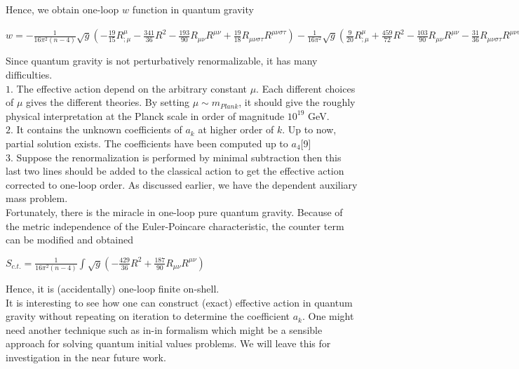 \documentclass[a4paper,12 pt]{article}
\begin{document}
Hence, we obtain one-loop $w$ function in quantum gravity
\begin{center}
$ w = - \frac{1}{16\pi^{2}(n-4)}\sqrt{g}(-
\frac{19}{15}R_{;\mu}^{\mu}- \frac{341}{36}R^{2}-
\frac{193}{90}R_{\mu\nu}R^{\mu\nu} +
\frac{19}{18}R_{\mu\nu\sigma\tau}R^{\mu\nu\sigma\tau}) -
\frac{1}{16\pi^{2}}\sqrt{g}(\frac{9}{20}R_{;\mu}^{\mu} +
\frac{459}{72}R^{2}-
\frac{103}{90}R_{\mu\nu}R^{\mu\nu}-\frac{31}{36}R_{\mu\nu\sigma\tau}R^{\mu\nu\sigma\tau})
-
\frac{i}{64\pi^{2}}\sqrt{g}\int_{0}^{\infty}ln(4i\pi\mu^{2})(\frac{\partial}{i\partial
s})^{3}[tr\Lambda(x,x,s)-2 tr\Lambda_{gh}(x,x,s)]ds $
\end{center}

Since quantum gravity is not perturbatively renormalizable, it has many difficulties. \\
$1.$ The effective action depend on the arbitrary constant $\mu$.
Each different choices of $\mu$ gives the different theories. By
setting $\mu \sim m_{Plank}$, it should give the roughly physical
interpretation at the Planck scale in order of magnitude
$10^{19}$ GeV. \\
$2.$ It contains the unknown coefficients of $a_{k}$ at higher
order of $k$. Up to now, partial solution exists. The coefficients
have been computed up to $a_{4}$[9] \\
$3.$ Suppose the renormalization is performed by minimal
subtraction then this last two lines should be added to the
classical action to get the effective action corrected to one-loop
order. As discussed earlier, we have the dependent auxiliary mass
problem.\\
Fortunately, there is the miracle in one-loop pure quantum
gravity. Because of the metric independence of the Euler-Poincare
characteristic, the counter term can be modified and obtained

\begin{center}
$ S_{c.t.
} = \frac{1}{16 \pi^{2}(n-4)}\int\sqrt{g}(-
\frac{429}{36}R^{2} + \frac{187}{90}R_{\mu\nu}R^{\mu\nu})$
\end{center}
Hence, it is (accidentally) one-loop finite on-shell.\\

It is interesting to see how one can construct (exact) effective
action in quantum gravity without repeating on iteration to
determine the coefficient $a_{k}$. One might need another
technique such as in-in formalism which might be a sensible
approach for solving quantum initial values problems. We will
leave this for investigation in the near future work.
\end{document}
